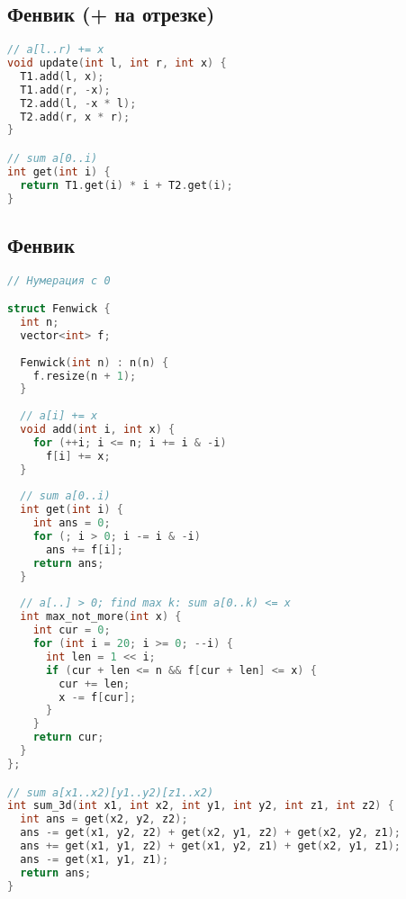 \documentclass[9pt,a4paper,landscape,twosided]{extarticle}
\begin{document}
\begin{multicols*}{3}
\subsection{Фенвик (+ на отрезке)}
\begin{lstlisting}[language=C++]
// a[l..r) += x
void update(int l, int r, int x) {
  T1.add(l, x);
  T1.add(r, -x);
  T2.add(l, -x * l);
  T2.add(r, x * r);
}

// sum a[0..i)
int get(int i) {
  return T1.get(i) * i + T2.get(i);
}

\end{lstlisting}

\subsection{Фенвик}
\begin{lstlisting}[language=C++]
// Нумерация с 0

struct Fenwick {
  int n;
  vector<int> f;
 
  Fenwick(int n) : n(n) {
    f.resize(n + 1);
  }
 
  // a[i] += x
  void add(int i, int x) {
    for (++i; i <= n; i += i & -i)
      f[i] += x;
  }
 
  // sum a[0..i)
  int get(int i) {
    int ans = 0;
    for (; i > 0; i -= i & -i)
      ans += f[i];
    return ans;
  }
 
  // a[..] > 0; find max k: sum a[0..k) <= x
  int max_not_more(int x) {
    int cur = 0;
    for (int i = 20; i >= 0; --i) {
      int len = 1 << i;
      if (cur + len <= n && f[cur + len] <= x) {
        cur += len;
        x -= f[cur];
      }
    }
    return cur;
  }
};

// sum a[x1..x2)[y1..y2)[z1..x2)
int sum_3d(int x1, int x2, int y1, int y2, int z1, int z2) {
  int ans = get(x2, y2, z2);
  ans -= get(x1, y2, z2) + get(x2, y1, z2) + get(x2, y2, z1);
  ans += get(x1, y1, z2) + get(x1, y2, z1) + get(x2, y1, z1);
  ans -= get(x1, y1, z1);
  return ans;
}
\end{lstlisting}


\end{multicols*}
\end{document}
